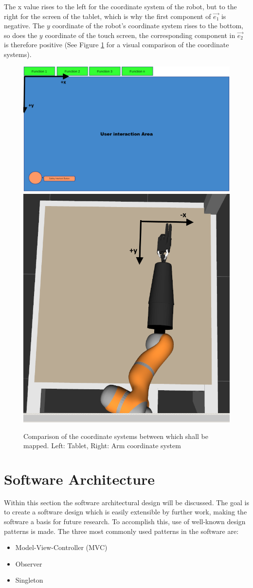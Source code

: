 The x value rises to the left for the coordinate system of the robot, but to the right for the screen of the tablet, which is why the first component of $\vec{e_1}$ is negative. The $y$ coordinate of the robot's coordinate system rises to the bottom, so does the $y$ coordinate of the touch screen, the corresponding component in $\vec{e_2}$ is therefore positive (See Figure \ref{fig:dfmt:coords} for a visual comparison of the coordinate systems).

\begin{figure}
	\caption{\label{fig:dfmt:coords}Comparison of the coordinate systems between which shall be mapped. Left: Tablet, Right: Arm coordinate system}
	\includegraphics[width=0.655\linewidth]{assets/chpt_concepts/dfmt_coord_screen.png}
	\includegraphics[width=0.333\linewidth]{assets/chpt_concepts/dfmt_coord_arm.png}
\end{figure}

\section{Software Architecture}

Within this section the software architectural design will be discussed. The goal is to create a software design which is easily extensible by further work, making the software a basis for future research. To accomplish this, use of well-known design patterns is made. The three most commonly used patterns in the software are:
\begin{itemize}
	\item Model-View-Controller (MVC)
	\item Observer
	\item Singleton
\end{itemize}

